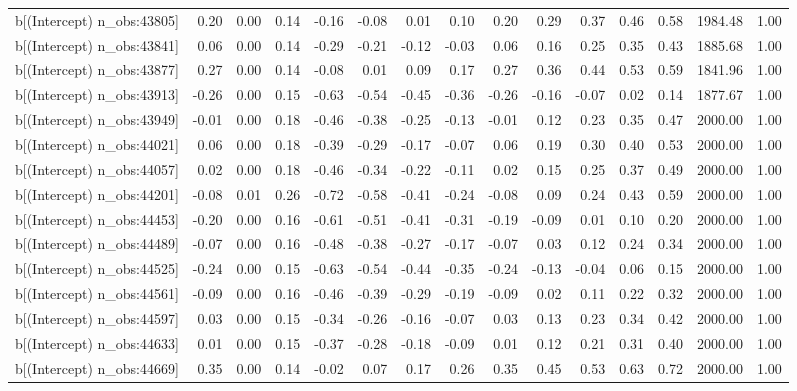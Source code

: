 \begin{table}[ht]
\begin{tabular}{rrrrrrrrrrrrrrr}
  b[(Intercept) n\_obs:43805] & 0.20 & 0.00 & 0.14 & -0.16 & -0.08 & 0.01 & 0.10 & 0.20 & 0.29 & 0.37 & 0.46 & 0.58 & 1984.48 & 1.00 \\ 
  b[(Intercept) n\_obs:43841] & 0.06 & 0.00 & 0.14 & -0.29 & -0.21 & -0.12 & -0.03 & 0.06 & 0.16 & 0.25 & 0.35 & 0.43 & 1885.68 & 1.00 \\ 
  b[(Intercept) n\_obs:43877] & 0.27 & 0.00 & 0.14 & -0.08 & 0.01 & 0.09 & 0.17 & 0.27 & 0.36 & 0.44 & 0.53 & 0.59 & 1841.96 & 1.00 \\ 
  b[(Intercept) n\_obs:43913] & -0.26 & 0.00 & 0.15 & -0.63 & -0.54 & -0.45 & -0.36 & -0.26 & -0.16 & -0.07 & 0.02 & 0.14 & 1877.67 & 1.00 \\ 
  b[(Intercept) n\_obs:43949] & -0.01 & 0.00 & 0.18 & -0.46 & -0.38 & -0.25 & -0.13 & -0.01 & 0.12 & 0.23 & 0.35 & 0.47 & 2000.00 & 1.00 \\ 
  b[(Intercept) n\_obs:44021] & 0.06 & 0.00 & 0.18 & -0.39 & -0.29 & -0.17 & -0.07 & 0.06 & 0.19 & 0.30 & 0.40 & 0.53 & 2000.00 & 1.00 \\ 
  b[(Intercept) n\_obs:44057] & 0.02 & 0.00 & 0.18 & -0.46 & -0.34 & -0.22 & -0.11 & 0.02 & 0.15 & 0.25 & 0.37 & 0.49 & 2000.00 & 1.00 \\ 
  b[(Intercept) n\_obs:44201] & -0.08 & 0.01 & 0.26 & -0.72 & -0.58 & -0.41 & -0.24 & -0.08 & 0.09 & 0.24 & 0.43 & 0.59 & 2000.00 & 1.00 \\ 
  b[(Intercept) n\_obs:44453] & -0.20 & 0.00 & 0.16 & -0.61 & -0.51 & -0.41 & -0.31 & -0.19 & -0.09 & 0.01 & 0.10 & 0.20 & 2000.00 & 1.00 \\ 
  b[(Intercept) n\_obs:44489] & -0.07 & 0.00 & 0.16 & -0.48 & -0.38 & -0.27 & -0.17 & -0.07 & 0.03 & 0.12 & 0.24 & 0.34 & 2000.00 & 1.00 \\ 
  b[(Intercept) n\_obs:44525] & -0.24 & 0.00 & 0.15 & -0.63 & -0.54 & -0.44 & -0.35 & -0.24 & -0.13 & -0.04 & 0.06 & 0.15 & 2000.00 & 1.00 \\ 
  b[(Intercept) n\_obs:44561] & -0.09 & 0.00 & 0.16 & -0.46 & -0.39 & -0.29 & -0.19 & -0.09 & 0.02 & 0.11 & 0.22 & 0.32 & 2000.00 & 1.00 \\ 
  b[(Intercept) n\_obs:44597] & 0.03 & 0.00 & 0.15 & -0.34 & -0.26 & -0.16 & -0.07 & 0.03 & 0.13 & 0.23 & 0.34 & 0.42 & 2000.00 & 1.00 \\ 
  b[(Intercept) n\_obs:44633] & 0.01 & 0.00 & 0.15 & -0.37 & -0.28 & -0.18 & -0.09 & 0.01 & 0.12 & 0.21 & 0.31 & 0.40 & 2000.00 & 1.00 \\ 
  b[(Intercept) n\_obs:44669] & 0.35 & 0.00 & 0.14 & -0.02 & 0.07 & 0.17 & 0.26 & 0.35 & 0.45 & 0.53 & 0.63 & 0.72 & 2000.00 & 1.00 \\ 

\end{tabular}
\end{table}
